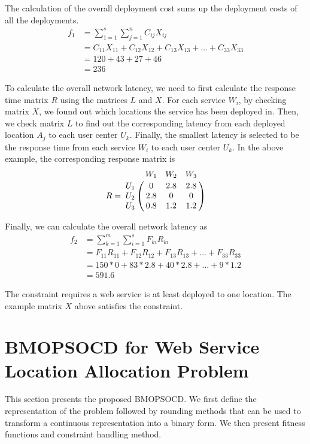 \documentclass[10pt,journal,compsoc]{IEEEtran}
\let\bbordermatrix\bordermatrix
\begin{document}
The calculation of the overall deployment cost sums up the deployment costs of all the deployments.
\begin{align*}
f_1 & = \sum\limits_{1=1}^s \sum\limits_{j = 1}^n C_{ij} X_{ij}\\
& = C_{11} X_{11} + C_{12} X_{12} + C_{13} X_{13} + ... + C_{33} X_{33} \\
& = 120 + 43 + 27 + 46 \\
& = 236
\end{align*}

To calculate the overall network latency, we need to first calculate the response time matrix $R$ using the matrices $L$ and $X$. For each service $W_i$, by checking matrix $X$, we found out which locations the service has been deployed in. Then, we check matrix $L$ to find out the corresponding latency from each deployed location $A_j$ to each user center $U_k$. Finally, the smallest latency is selected to be the response time from each service $W_i$ to each user center $U_k$. In the above example, the corresponding response matrix is
$$
R = \bbordermatrix{~ & W_{1} & W_{2} & W_{3}\cr
	U_{1}	&0 &2.8 &2.8	\cr
	U_{2}	&2.8  &0 &0	\cr
	U_{3}	&0.8 &1.2 &1.2	\cr}
$$

Finally, we can calculate the overall network latency as
\begin{equation*}
\begin{aligned}
f_2 & = \sum\limits_{k=1}^m \sum\limits_{i=1}^s F_{ki} R_{ki}\\
  & = F_{11} R_{11} + F_{12} R_{12} + F_{13} R_{13} + ... + F_{33} R_{33} \\
  &= 150 * 0 + 83 * 2.8 + 40 * 2.8 + \dots + 9 * 1.2 \\
  &= 591.6
\end{aligned}
\end{equation*}

The constraint requires a web service is at least deployed to one location. The example matrix $X$ above satisfies the constraint.

\vspace{-3 mm}
\section{BMOPSOCD for Web Service Location Allocation Problem} \label{sec:methods}

This section presents the proposed BMOPSOCD. We first define the representation of the problem followed by rounding methods that can be used to transform a continuous representation into a binary form. We then present fitness functions and constraint handling method.
\end{document}
